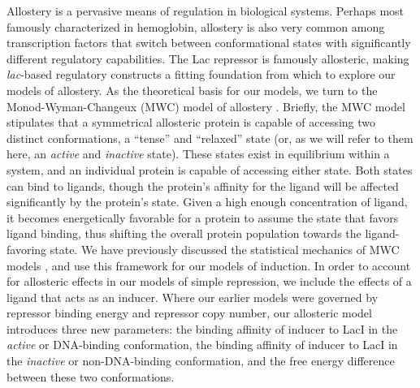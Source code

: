 Allostery is a pervasive means of regulation in biological systems. Perhaps most famously characterized in hemoglobin, allostery is also very common among transcription factors that switch between conformational states with significantly different regulatory capabilities. The Lac repressor is famously allosteric, making \textit{lac}-based regulatory constructs a fitting foundation from which to explore our models of allostery. As the theoretical basis for our models, we turn to the Monod-Wyman-Changeux (MWC) model of allostery
\cite{MONOD1965}. Briefly,
the MWC model stipulates that a symmetrical allosteric protein is capable of accessing two distinct conformations, a ``tense'' and ``relaxed'' state (or, as we will
refer to them here, an \textit{active} and \textit{inactive} state). These states exist in
equilibrium within a system, and an individual protein is capable of accessing either state. Both states can bind to ligands, though the protein's
affinity for the ligand will be affected significantly by the protein's
state. Given a high enough concentration of ligand, it becomes
energetically favorable for a protein to assume the state that favors ligand binding, thus shifting the overall protein
population towards the ligand-favoring state. We have previously discussed the
statistical mechanics of MWC models \cite{Marzen2013}, and use this framework for our models of induction. In order to account for allosteric effects in our models of simple repression, we include the effects of a ligand that acts as an inducer. Where our earlier models were governed by repressor binding energy and repressor copy number, our allosteric model introduces three
new parameters: the binding affinity of inducer to LacI in the \textit{active} or DNA-binding conformation, the binding affinity of inducer to LacI
in the \textit{inactive} or non-DNA-binding conformation, and the free energy
difference between these two conformations. 

